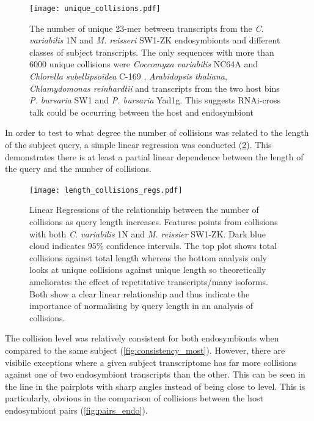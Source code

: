 \begin{figure}
    \texttt{[image: unique\_collisions.pdf]}
    \caption[Unique eDicer Collisions by Subject Class]{The number of unique 23-mer
        between transcripts from the \textit{C. variabilis} 1N
    and \textit{M. reisseri} SW1-ZK endosymbionts and different
classes of subject transcripts.  The only sequences with more than 6000
unique collisions were \textit{Coccomyxa variabilis} NC64A and \textit{Chlorella subellipsoidea} C-169
, \textit{Arabidopsis thaliana}, \textit{Chlamydomonas reinhardtii} and transcripts
from the two host bins \textit{P. bursaria} SW1 and \textit{P. bursaria} Yad1g.  
This suggests RNAi-cross talk could be occurring between the host and endosymbiont}
\label{fig:unique_collisions}
\end{figure}

In order to test to what degree the number of collisions was related
to the length of the subject query, a simple linear regression
was conducted (\cref{fig:edicer_collisions_by_length}).  
This demonstrates there is at least a partial linear dependence between the 
length of the query and the number of collisions.

\begin{figure}
    \centering
    \texttt{[image: length\_collisions\_regs.pdf]}
    \caption[Regression of eDicer Collisions by Query Length]{Linear Regressions
    of the relationship between the number of collisions as query length
increases. Features points from collisions with both \textit{C. variabilis} 1N
and \textit{M. reissier} SW1-ZK.  Dark blue cloud indicates \(95\%\) confidence
intervals.  
The top plot shows total collisions against
total length whereas the bottom analysis only looks at unique collisions
against unique length so theoretically ameliorates the effect of repetitative 
transcripts/many isoforms.  Both show a clear linear relationship and thus
indicate the importance of normalising by query length in an analysis of 
collisions.}
    \label{fig:edicer_collisions_by_length}
\end{figure}

The collision level was relatively consistent for both endosymbionts
when compared to the same subject (\cref{fig:consistency_most}). 
However, there are visibile exceptions where a given subject
transcriptome has far more collisions against one of two
endosymbiont transcripts than the other.  This can be seen
in the line in the pairplots with sharp angles instead of
being close to level. This is particularly, obvious in 
the comparison of collisions between the host endosymbiont pairs
(\cref{fig:pairs_endo}). 

